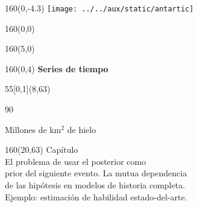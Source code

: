 \documentclass[shownotes,aspectratio=169]{beamer}
\newcounter{capitulo}
\newcommand{\unidad}{\thecapitulo \stepcounter{capitulo}}
\begin{document}
\begin{frame}
\begin{textblock}{160}(0,-4.3) \centering
\texttt{[image: ../../aux/static/antartic]}
\end{textblock}

\begin{textblock}{160}(0,0) \centering
{}
\end{textblock}

\begin{textblock}{160}(5,0)
\end{textblock}


\begin{textblock}{160}(0,4) \centering
\LARGE \hspace{1cm} \textcolor{black!10}{\fontsize{22}{0}\selectfont \textbf{Series de tiempo}}
\end{textblock}


\begin{textblock}{55}[0,1](8,63)
\begin{turn}{90}
\parbox{6cm}{\footnotesize
\textcolor{black!10}{Millones de km$^2$ de hielo}}
\end{turn}
\end{textblock}


\begin{textblock}{160}(20,63)
\textcolor{black!5}{Capítulo \unidad \\ \small
El problema de usar el posterior como \\
prior del siguiente evento. La mutua dependencia \\
de las hipótesis en modelos de historia completa.  \\
Ejemplo: estimación de habilidad estado-del-arte. \\
}
\end{textblock}


\end{frame}
\end{document}
